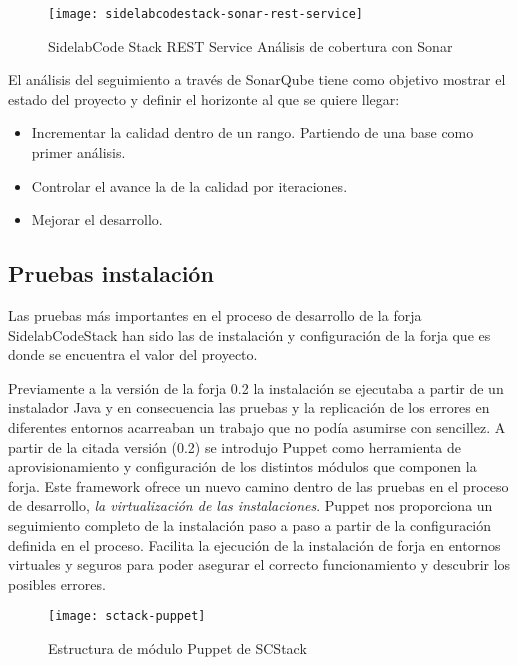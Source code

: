 \begin{figure}[H]
    \centering
    \texttt{[image: sidelabcodestack-sonar-rest-service]}
    \caption{SidelabCode Stack REST Service Análisis de cobertura con Sonar}
    \label{fig:sidelabcodestack-sonar-rest-service}
\end{figure}

\par El an\'alisis del seguimiento a trav\'es de SonarQube tiene como objetivo mostrar el estado del proyecto y definir el horizonte al que se quiere llegar:

\begin{itemize}
	\item Incrementar la calidad dentro de un rango. Partiendo de una base como primer an\'alisis.
	\item Controlar el avance la de la calidad por iteraciones.
	\item Mejorar el desarrollo.
\end{itemize}

\subsection{Pruebas instalación}
\label{sub:pruebas-instalacion}

\par Las pruebas más importantes en el proceso de desarrollo de la forja SidelabCodeStack han sido las de instalación y configuración de la forja que es donde se encuentra el valor del proyecto. 

\par Previamente a la versión de la forja 0.2 la instalación se ejecutaba a partir de un instalador Java y en consecuencia las pruebas y la replicación de los errores en diferentes entornos acarreaban un trabajo que no podía asumirse con sencillez. A partir de la citada versión (0.2) se introdujo Puppet como herramienta de aprovisionamiento y configuración de los distintos módulos que componen la forja. Este framework ofrece un nuevo camino dentro de las pruebas en el proceso de desarrollo, \emph{la virtualización de las instalaciones}. Puppet nos proporciona un seguimiento completo de la instalación paso a paso a partir de la configuración definida en el proceso. Facilita la ejecución de la instalación de forja en entornos virtuales y seguros para poder asegurar el correcto funcionamiento y descubrir los posibles errores.

\begin{figure}[H]
    \centering
    \texttt{[image: sctack-puppet]}
    \caption{Estructura de módulo Puppet de SCStack}
    \label{sctack-puppet}
\end{figure}

